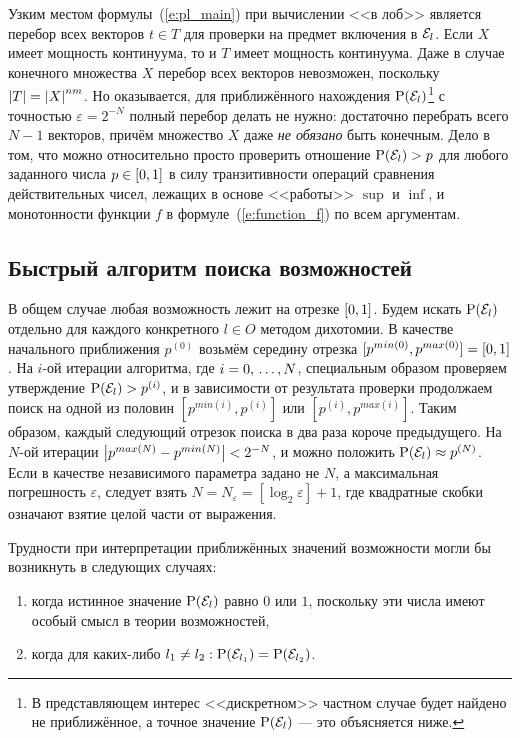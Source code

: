 Узким местом формулы~(\ref{e:pl_main}) при вычислении <<в лоб>> является перебор всех векторов $t \in T$ для проверки на предмет включения в $\mathcal{E}_l$. Если $X$ имеет мощность континуума, то и $T$ имеет мощность континуума. Даже в случае конечного множества $X$ перебор всех векторов невозможен, поскольку $\left| T \right| = \left| X \right|^{nm}$. Но оказывается, для приближённого нахождения ${\mathrm{P}}(\mathcal{E}_l)$\footnote{В представляющем интерес <<дискретном>> частном случае будет найдено не приближённое, а точное значение ${\mathrm{P}}(\mathcal{E}_l)$ --- это объясняется ниже.} с точностью $\varepsilon = 2^{-N}$ полный перебор делать не нужно: достаточно перебрать всего $N-1$ векторов, причём множество $X$ даже {\sl не обязано} быть конечным. Дело в том, что можно относительно просто проверить отношение ${\mathrm{P}}(\mathcal{E}_l) > p$ для любого заданного числа $p \in [0,1]$ в силу транзитивности операций сравнения действительных чисел, лежащих в основе <<работы>>  $\sup$ и $\inf$, и монотонности функции $f$ в формуле~(\ref{e:function_f}) по всем аргументам. 

\subsection{Быстрый алгоритм поиска возможностей}
\label{algo_poss_vals}

В общем случае любая возможность лежит на отрезке $[0,1]$. Будем искать ${\mathrm{P}}(\mathcal{E}_l)$ отдельно для каждого конкретного $l \in O$ методом дихотомии. В качестве начального приближения $p^{(0)}$ возьмём середину отрезка $[p^{min(0)}, p^{max(0)}] = [0,1]$. На $i$-ой итерации алгоритма, где $i = 0, \, \ldots, N$, специальным образом проверяем утверждение ${\mathrm{P}}(\mathcal{E}_l) > p^{(i)}$, и в зависимости от результата проверки продолжаем поиск на одной из половин $[p^{min(i)}, p^{(i)}]$ или $[p^{(i)}, p^{max(i)}]$. Таким образом, каждый следующий отрезок поиска в два раза короче предыдущего.  На $N$-ой итерации $\left| p^{max(N)} - p^{min(N)} \right| < 2^{-N}$, и можно положить ${\mathrm{P}}(\mathcal{E}_l) \approx p^{(N)}$. Если в качестве независимого параметра задано не $N$, а максимальная погрешность  $\varepsilon$, следует взять $N = N_{\varepsilon} = [\log_2{\varepsilon}]+1$,  где квадратные скобки означают взятие целой части от выражения. 

Трудности при интерпретации приближённых значений возможности могли бы возникнуть в следующих случаях:
\begin{enumerate}
  \item когда истинное значение ${\mathrm{P}}(\mathcal{E}_l)$ равно $0$ или $1$, поскольку эти числа имеют особый смысл в теории возможностей,
  \item когда для каких-либо $l_1 \neq l_2: {\mathrm{P}}(\mathcal{E}_{l_1}) = {\mathrm{P}}(\mathcal{E}_{l_2})$.
\end{enumerate}

